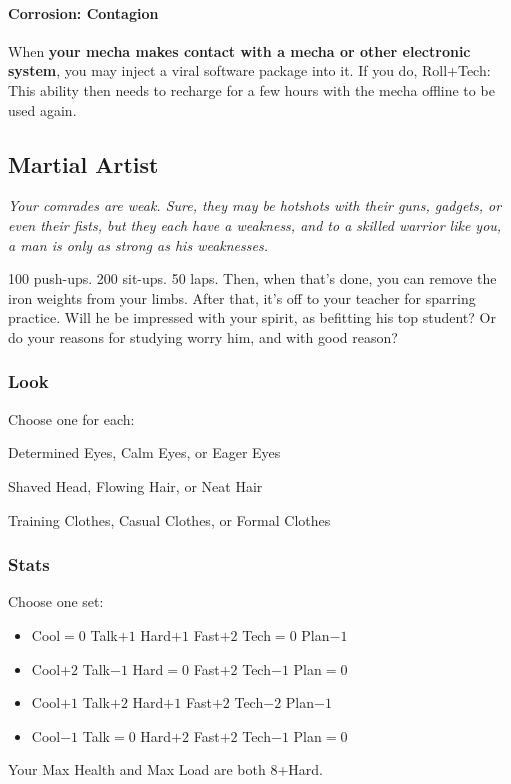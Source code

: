 \paragraph{Corrosion: Contagion} 
When \textbf{your mecha makes contact with a mecha or other electronic
  system}, you may inject a viral software package into it. If you do,
Roll+Tech:  This ability then needs to
recharge for a few hours with the mecha offline to be used again.



\subsection{Martial Artist}
{\itshape Your comrades are weak. Sure, they may be hotshots with
  their guns, gadgets, or even their fists, but they each have a
  weakness, and to a skilled warrior like you, a man is only as strong
  as his weaknesses.

100 push-ups. 200 sit-ups. 50 laps. Then, when that's done, you can
remove the iron weights from your limbs. After that, it's off to your
teacher for sparring practice. Will he be impressed with your spirit,
as befitting his top student? Or do your reasons for studying worry
him, and with good reason?}
\subsubsection{Look}
Choose one for each:

Determined Eyes, Calm Eyes, or Eager Eyes

Shaved Head, Flowing Hair, or Neat Hair

Training Clothes, Casual Clothes, or Formal Clothes

\subsubsection{Stats}
Choose one set:
\begin{itemize}
\setlength\itemsep{0em}
\item Cool${=}0$ Talk$+1$ Hard$+1$ Fast$+2$ Tech${=}0$ Plan$-1$
\item Cool$+2$ Talk$-1$ Hard${=}0$ Fast$+2$ Tech$-1$ Plan${=}0$
\item Cool$+1$ Talk$+2$ Hard$+1$ Fast$+2$ Tech$-2$ Plan$-1$
\item Cool$-1$ Talk${=}0$ Hard$+2$ Fast$+2$ Tech$-1$ Plan${=}0$
\end{itemize}
Your Max Health and Max Load are both 8+Hard.

